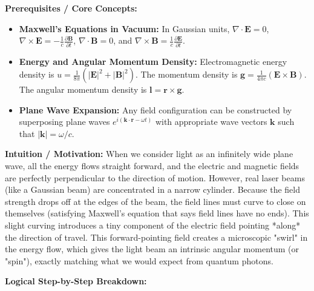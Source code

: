 \begin{solution}
\textbf{Prerequisites / Core Concepts:}
\begin{itemize}
    \item \textbf{Maxwell's Equations in Vacuum:} In Gaussian units, $\nabla \cdot \mathbf{E} = 0$, $\nabla \times \mathbf{E} = -\frac{1}{c}\frac{\partial \mathbf{B}}{\partial t}$, $\nabla \cdot \mathbf{B} = 0$, and $\nabla \times \mathbf{B} = \frac{1}{c}\frac{\partial \mathbf{E}}{\partial t}$.
    \item \textbf{Energy and Angular Momentum Density:} Electromagnetic energy density is $u = \frac{1}{8\pi}(|\mathbf{E}|^2 + |\mathbf{B}|^2)$. The momentum density is $\mathbf{g} = \frac{1}{4\pi c}(\mathbf{E} \times \mathbf{B})$. The angular momentum density is $\mathbf{l} = \mathbf{r} \times \mathbf{g}$.
    \item \textbf{Plane Wave Expansion:} Any field configuration can be constructed by superposing plane waves $e^{i(\mathbf{k} \cdot \mathbf{r} - \omega t)}$ with appropriate wave vectors $\mathbf{k}$ such that $|\mathbf{k}| = \omega/c$.
\end{itemize}

\textbf{Intuition / Motivation:}
When we consider light as an infinitely wide plane wave, all the energy flows straight forward, and the electric and magnetic fields are perfectly perpendicular to the direction of motion. However, real laser beams (like a Gaussian beam) are concentrated in a narrow cylinder. Because the field strength drops off at the edges of the beam, the field lines must curve to close on themselves (satisfying Maxwell's equation that says field lines have no ends). This slight curving introduces a tiny component of the electric field pointing *along* the direction of travel. This forward-pointing field creates a microscopic "swirl" in the energy flow, which gives the light beam an intrinsic angular momentum (or "spin"), exactly matching what we would expect from quantum photons.

\textbf{Logical Step-by-Step Breakdown:}


\end{solution}
